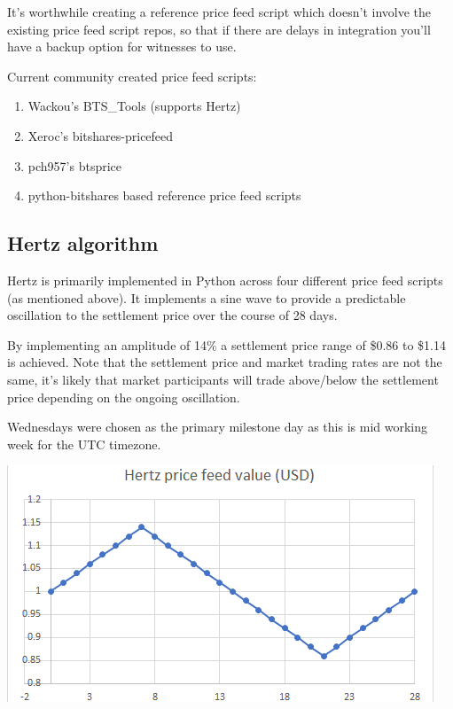 \documentclass[sigconf]{acmart}
\begin{document}
It's worthwhile creating a reference price feed script which doesn't involve the existing price feed script repos, so that if there are delays in integration you'll have a backup option for witnesses to use.

\smallskip

\noindent Current community created price feed scripts:
\begin{enumerate}[wide, labelwidth=!, labelindent=0pt]
\item Wackou's BTS\_Tools (supports Hertz)\citep{wackou_wackous_2018}
\item Xeroc's bitshares-pricefeed \citep{xeroc_xerocs_2018} 
\item pch957's btsprice \citep{pch957_pch957s_2018}
\item python-bitshares based reference price feed scripts\citep{customminer_reference_2018}
\end{enumerate}

\subsection{Hertz algorithm}

\noindent Hertz is primarily implemented in Python across four different price feed scripts (as mentioned above). It implements a sine wave to provide a predictable oscillation to the settlement price over the course of 28 days. 

By implementing an amplitude of 14\% a settlement price range of \$0.86 to \$1.14 is achieved. Note that the settlement price and market trading rates are not the same, it's likely that market participants will trade above/below the settlement price depending on the ongoing oscillation.

Wednesdays were chosen as the primary milestone day as this is mid working week for the UTC timezone.

\bigskip

\noindent \includegraphics[width=\columnwidth]{hertz_chart.png}
\end{document}
